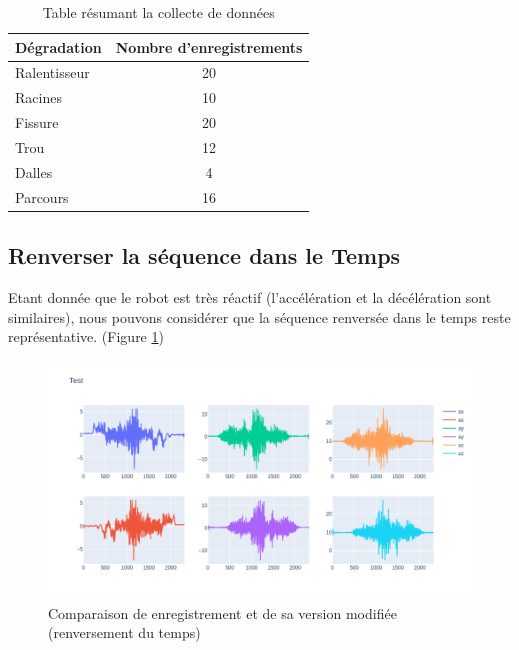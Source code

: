 \begin{table}[]
    \begin{tabular}{|l|c|}
    \hline
    Dégradation  & \multicolumn{1}{l|}{Nombre d'enregistrements} \\ \hline
    Ralentisseur & 20                                            \\ \hline
    Racines      & 10                                            \\ \hline
    Fissure      & 20                                            \\ \hline
    Trou         & 12                                            \\ \hline
    Dalles       & 4                                             \\ \hline
    Parcours     & 16                                            \\ \hline
    \end{tabular}
    \caption{Table résumant la collecte de données}
    \label{data_collection_table}
\end{table}

\subsection{Renverser la séquence dans le Temps}
Etant donnée que le robot est très réactif (l'accélération et la décélération sont similaires), nous pouvons considérer que la séquence renversée dans le temps reste représentative. (Figure \ref{data_augmentation_1})

\begin{figure}
    \center
    \includegraphics[scale=0.5]{img/reversed_data.png}
    \caption{Comparaison de enregistrement et de sa version modifiée (renversement du temps)}
    \label{data_augmentation_1}
\end{figure}

